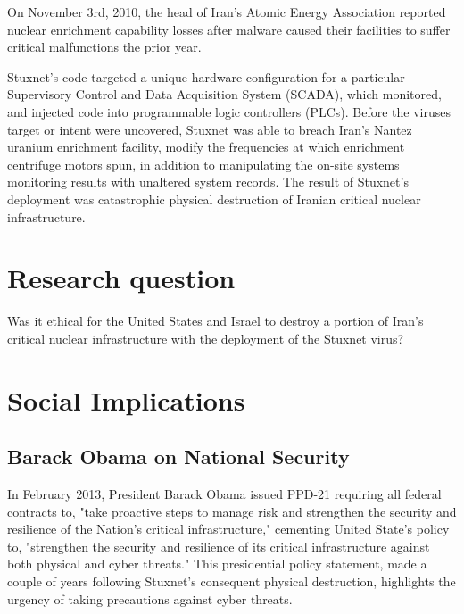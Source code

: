 \documentclass[12pt]{article}
\begin{document}
\begin{multicols}{2}
On November 3rd, 2010, the head of Iran's Atomic Energy Association reported nuclear enrichment capability losses after malware caused their facilities to suffer critical malfunctions the prior year.\cite{didStuxnetTakeOut1000Centrifuges} 

Stuxnet's code targeted a unique hardware configuration for a particular Supervisory Control and Data Acquisition System (SCADA), which monitored, and injected code into programmable logic controllers (PLCs). Before the viruses target or intent were uncovered, Stuxnet was able to breach Iran's Nantez uranium enrichment facility, modify the frequencies at which enrichment centrifuge motors spun, in addition to manipulating the on-site systems monitoring results with unaltered system records. The result of Stuxnet's deployment was catastrophic physical destruction of Iranian critical nuclear infrastructure.\cite{w32.stuxnetDossier}\cite{lessonsFromStuxnet}

\section{Research question}

Was it ethical for the United States and Israel to destroy a portion of Iran's critical nuclear infrastructure with the deployment of the Stuxnet virus?

\section{Social Implications}

\subsection{Barack Obama on National Security}

In February 2013, President Barack Obama issued PPD-21 requiring all federal contracts to, "take proactive steps to manage risk and strengthen the security and resilience of the Nation’s critical infrastructure," cementing United State's policy to, "strengthen the security and resilience of its critical infrastructure against both physical and cyber threats."\cite{industrialCyberVulnerabilities} This presidential policy statement, made a couple of years following Stuxnet's consequent physical destruction, highlights the urgency of taking precautions against cyber threats.


\end{multicols}
\end{document}
